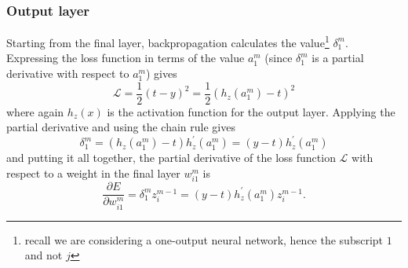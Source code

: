 \documentclass[../main.tex]{subfiles}
\begin{document}
\subsubsection{Output layer}
Starting from the final layer, backpropagation calculates the value\footnote{recall we are considering a one-output
neural network, hence the subscript $1$ and not $j$} $\delta_{1}^{m}$.
%
Expressing the loss function in terms of the value $a_{1}^{m}$ (since $\delta_{1}^{m}$ is a partial derivative with
respect to $a_{1}^{m}$) gives
%
\begin{equation}
  \mathcal{L} = \frac{1}{2} {(t - y)}^{2} = \frac{1}{2} {\left(h_{z}(a_{1}^{m}) - t\right)}^{2}
\end{equation}
%
where again $h_{z}(x)$ is the activation function for the output layer.
%
Applying the partial derivative and using the chain rule gives
%
\begin{equation}
  \delta_{1}^{m} = {\left(h_{z}(a_{1}^{m}) - t\right)} h_{z}^{\prime}(a_{1}^{m}) = (y - t) h_{z}^{\prime}(a_{1}^{m})
\end{equation}
%
and putting it all together, the partial derivative of the loss function $\mathcal{L}$ with respect to a weight in the
final layer $w_{i1}^{m}$ is
%
\begin{equation}
  \frac{\partial E}{\partial w_{i1}^{m}} = \delta_{1}^{m} z_{i}^{m-1} = (y - t) h_{z}^{\prime}(a_{1}^{m}) z_{i}^{m-1}.
  \label{eq:output_layer}
\end{equation}
\end{document}
